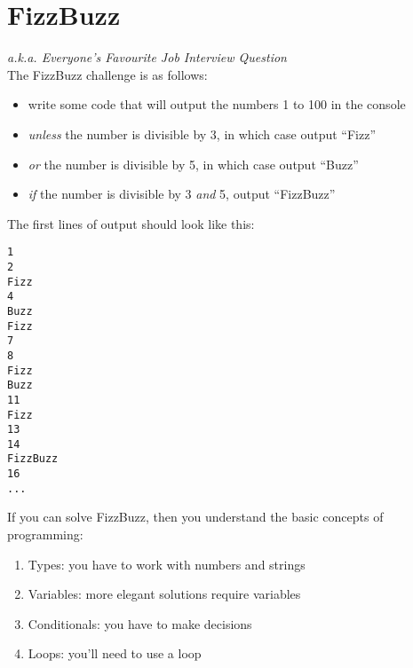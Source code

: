 \section{FizzBuzz}

\textit{a.k.a. Everyone's Favourite Job Interview Question}
\\

The FizzBuzz challenge is as follows:

\begin{itemize}
    \item write some code that will output the numbers 1 to 100 in the console
    \item \textit{unless} the number is divisible by 3, in which case output ``Fizz''
    \item \textit{or} the number is divisible by 5, in which case output ``Buzz''
    \item \textit{if} the number is divisible by 3 \textit{and} 5, output ``FizzBuzz''
\end{itemize}

The first lines of output should look like this:

\begin{verbatim}
1
2
Fizz
4
Buzz
Fizz
7
8
Fizz
Buzz
11
Fizz
13
14
FizzBuzz
16
...
\end{verbatim}

If you can solve FizzBuzz, then you understand the basic concepts of programming:

\begin{enumerate}
    \item Types: you have to work with numbers and strings
    \item Variables: more elegant solutions require variables
    \item Conditionals: you have to make decisions
    \item Loops: you'll need to use a loop
\end{enumerate}


\pagebreak

